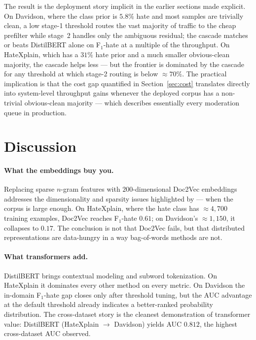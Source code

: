 \documentclass[11pt]{article}
\begin{document}
The result is the deployment story implicit in the earlier sections
made explicit. On Davidson, where the class prior is $5.8\%$ hate and
most samples are trivially clean, a low stage-1 threshold routes the
vast majority of traffic to the cheap prefilter while stage~2 handles
only the ambiguous residual; the cascade matches or beats DistilBERT
alone on F$_1$-hate at a multiple of the throughput. On HateXplain,
which has a $31\%$ hate prior and a much smaller obvious-clean
majority, the cascade helps less --- but the frontier is dominated by
the cascade for any threshold at which stage-2 routing is below
$\approx 70\%$. The practical implication is that the cost gap
quantified in Section~\ref{sec:cost} translates directly into
system-level throughput gains whenever the deployed corpus has a
non-trivial obvious-clean majority --- which describes essentially
every moderation queue in production.

\section{Discussion}

\paragraph{What the embeddings buy you.}
Replacing sparse $n$-gram features with $200$-dimensional Doc2Vec embeddings
addresses the dimensionality and sparsity issues highlighted by
\citet{djuric2015hate} --- when the corpus is large enough. On HateXplain,
where the hate class has $\approx 4{,}700$ training examples, Doc2Vec
reaches F$_1$-hate $0.61$; on Davidson's $\approx 1{,}150$, it collapses to
$0.17$. The conclusion is not that Doc2Vec fails, but that distributed
representations are data-hungry in a way bag-of-words methods are not.

\paragraph{What transformers add.}
DistilBERT brings contextual modeling and subword tokenization. On
HateXplain it dominates every other method on every metric. On Davidson the
in-domain F$_1$-hate gap closes only after threshold tuning, but the AUC
advantage at the default threshold already indicates a better-ranked
probability distribution. The cross-dataset story is the cleanest
demonstration of transformer value: DistilBERT (HateXplain $\to$ Davidson)
yields AUC $0.812$, the highest cross-dataset AUC observed.
\end{document}
